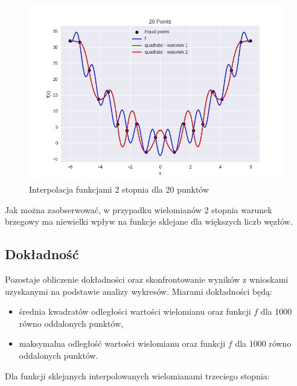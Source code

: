 \documentclass{article}
\begin{document}
\begin{figure}[H]
    \centering
    \includegraphics[width=\textwidth]{img/quadratic_20.png}
    \caption{Interpolacja funkcjami 2 stopnia dla 20 punktów}
\end{figure}

Jak można zaobserwować, w przypadku wielomianów 2 stopnia warunek brzegowy ma niewielki wpływ na funkcje sklejane dla większych liczb węzłów.

\subsection{Dokładność}
Pozostaje obliczenie dokładności oraz skonfrontowanie wyników z wnioskami uzyskanymi na podstawie analizy wykresów. Miarami dokładności będą:
\begin{itemize}
    \item
    średnia kwadratów odległości wartości wielomianu oraz funkcji $f$ dla 1000 równo oddalonych punktów,
    \item
    maksymalna odległość wartości wielomianu oraz funkcji $f$ dla 1000 równo oddalonych punktów.
\end{itemize}

Dla funkcji sklejanych interpolowanych wielomianami trzeciego stopnia:
\end{document}
